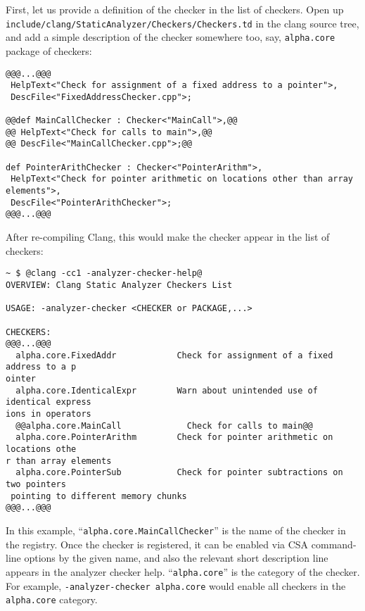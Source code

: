 \documentclass[a4paper,12pt]{article}
\newenvironment{nobr}{\begin{minipage}{\textwidth}\setlength\parskip{1em}
}{\end{minipage}\ignorespacesafterend}
\begin{document}
\begin{nobr}
First, let us provide a definition of the checker in the list of checkers. Open up \lstinline|include/clang/StaticAnalyzer/Checkers/Checkers.td| in the clang source tree, and add a simple description of the checker somewhere too, say, \lstinline|alpha.core| package of checkers:
\begin{lstlisting}[style=commandline,title=\lstinline|@Checkers.td@|]
@@@...@@@
 HelpText<"Check for assignment of a fixed address to a pointer">,
 DescFile<"FixedAddressChecker.cpp">;

@@def MainCallChecker : Checker<"MainCall">,@@
@@ HelpText<"Check for calls to main">,@@
@@ DescFile<"MainCallChecker.cpp">;@@

def PointerArithChecker : Checker<"PointerArithm">,
 HelpText<"Check for pointer arithmetic on locations other than array elements">,
 DescFile<"PointerArithChecker">;
@@@...@@@
\end{lstlisting}
\end{nobr}

\begin{nobr}
After re-compiling Clang, this would make the checker appear in the list of checkers:
\begin{lstlisting}[style=commandline]
~ $ @clang -cc1 -analyzer-checker-help@
OVERVIEW: Clang Static Analyzer Checkers List

USAGE: -analyzer-checker <CHECKER or PACKAGE,...>

CHECKERS:
@@@...@@@
  alpha.core.FixedAddr            Check for assignment of a fixed address to a p
ointer
  alpha.core.IdenticalExpr        Warn about unintended use of identical express
ions in operators
  @@alpha.core.MainCall             Check for calls to main@@
  alpha.core.PointerArithm        Check for pointer arithmetic on locations othe
r than array elements
  alpha.core.PointerSub           Check for pointer subtractions on two pointers
 pointing to different memory chunks
@@@...@@@
\end{lstlisting}
\end{nobr}

In this example, ``\lstinline|alpha.core.MainCallChecker|'' is the name of the checker in the registry. Once the checker is registered, it can be enabled via CSA command-line options by the given name, and also the relevant short description line appears in the analyzer checker help. ``\lstinline|alpha.core|'' is the category of the checker. For example, \lstinline|-analyzer-checker alpha.core| would enable all checkers in the \lstinline|alpha.core| category.
\end{document}

